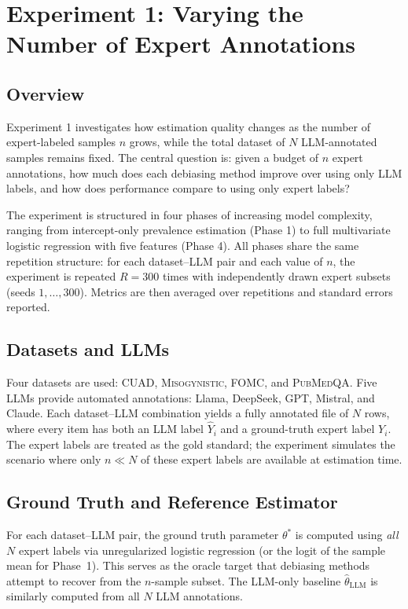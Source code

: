 \section{Experiment 1: Varying the Number of Expert Annotations}
\label{sec:experiment1}

\subsection{Overview}

Experiment 1 investigates how estimation quality changes as the number of expert-labeled samples $n$ grows, while the total dataset of $N$ LLM-annotated samples remains fixed. The central question is: given a budget of $n$ expert annotations, how much does each debiasing method improve over using only LLM labels, and how does performance compare to using only expert labels?

The experiment is structured in four phases of increasing model complexity, ranging from intercept-only prevalence estimation (Phase 1) to full multivariate logistic regression with five features (Phase 4). All phases share the same repetition structure: for each dataset--LLM pair and each value of $n$, the experiment is repeated $R = 300$ times with independently drawn expert subsets (seeds $1, \ldots, 300$). Metrics are then averaged over repetitions and standard errors reported.

\subsection{Datasets and LLMs}

Four datasets are used: \textsc{CUAD}, \textsc{Misogynistic}, \textsc{FOMC}, and \textsc{PubMedQA}. Five LLMs provide automated annotations: Llama, DeepSeek, GPT, Mistral, and Claude. Each dataset--LLM combination yields a fully annotated file of $N$ rows, where every item has both an LLM label $\hat{Y}_i$ and a ground-truth expert label $Y_i$. The expert labels are treated as the gold standard; the experiment simulates the scenario where only $n \ll N$ of these expert labels are available at estimation time.

\subsection{Ground Truth and Reference Estimator}

For each dataset--LLM pair, the ground truth parameter $\theta^*$ is computed using \emph{all} $N$ expert labels via unregularized logistic regression (or the logit of the sample mean for Phase~1). This serves as the oracle target that debiasing methods attempt to recover from the $n$-sample subset. The LLM-only baseline $\hat{\theta}_{\text{LLM}}$ is similarly computed from all $N$ LLM annotations.

